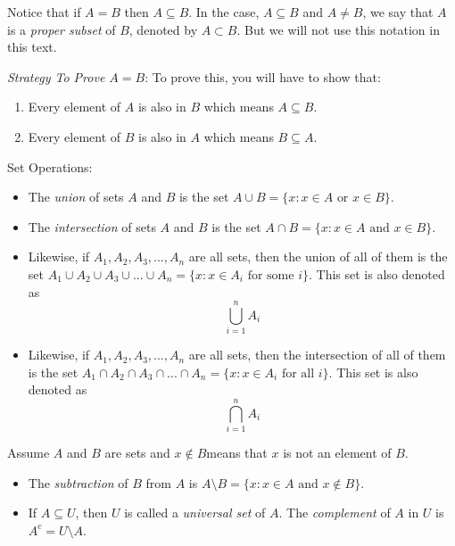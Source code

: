 Notice that if $A = B$ then $A \subseteq B$. In the case, $A \subseteq B$ and $A \neq B$, we say that $A$ is a \emph{proper subset} of $B$, denoted by $A \subset B$. But we will not use this notation in this text.

\break
\emph{Strategy To Prove $A = B$}: To prove this, you will have to show that:
\begin{enumerate}
	\item Every element of $A$ is also in $B$ which means $A \subseteq B$.
	\item Every element of $B$ is also in $A$ which means $B \subseteq A$.
\end{enumerate}

\begin{definition}
	Set Operations:
	\begin{itemize}
		\item The \emph{union} of sets $A$ and $B$ is the set $A \cup B = \{ x : x \in A \text{ or } x \in B \}$.

		\item The \emph{intersection} of sets $A$ and $B$ is the set $A \cap B = \{ x : x \in A \text{ and } x \in B \}$.

		\item Likewise, if $A_1, A_2, A_3, ..., A_n$ are all sets, then the union of all of them is the set 
			$A_1 \cup A_2 \cup A_3 \cup ... \cup A_n = \{ x : x \in A_i \text{ for some } i \}$. 
			This set is also denoted as $$\bigcup_{i=1}^{n} A_i$$

		\item Likewise, if $A_1, A_2, A_3, ..., A_n$ are all sets, then the intersection of all of them is the set 
			$A_1 \cap A_2 \cap A_3 \cap ... \cap A_n = \{ x : x \in A_i \text{ for all } i \}$. 
			This set is also denoted as $$\bigcap_{i=1}^{n} A_i$$
	\end{itemize}
\end{definition}

\begin{definition}\label{subtract}\label{complement}
Assume $A$ and $B$ are sets and $x \not\in B$means that $x$ is not an element of $B$.
\begin{itemize}
	\item The \emph{subtraction} of $B$ from $A$ is $A \setminus B = \{ x : x \in A \text{ and } x \not\in B \}$.
	\item If $A \subseteq U$, then $U$ is called a \emph{universal set} of $A$. The \emph{complement} of $A$ in $U$ is $A^c = U \setminus A$.
\end{itemize}
\end{definition}

